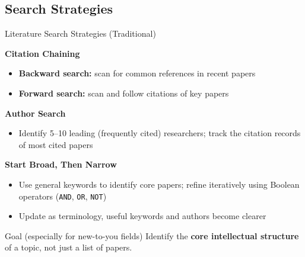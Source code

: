 \documentclass{beamer}
\begin{document}
\subsection{Search Strategies}
\begin{frame}{Literature Search Strategies (Traditional)}

  \footnotesize
  \textbf{Citation Chaining}
  \begin{itemize}
    \item \textbf{Backward search:} scan for common references in recent papers
    \item \textbf{Forward search:} scan and follow citations of key papers
  \end{itemize}

  \medskip
  \textbf{Author Search}
  \begin{itemize}
    \item Identify 5--10 leading (frequently cited) researchers;
    track the citation records of most cited papers
  \end{itemize}

  \medskip
  \textbf{Start Broad, Then Narrow}
  \begin{itemize}
    \item Use general keywords to identify core papers;
      refine iteratively using Boolean operators
      (\texttt{AND}, \texttt{OR}, \texttt{NOT})
    \item Update as terminology, useful keywords and authors become clearer
  \end{itemize}

  \medskip
  \begin{block}{Goal (especially for new-to-you fields)}
    Identify the \textbf{core intellectual structure} of a topic,
    not just a list of papers.
  \end{block}

\end{frame}


\end{document}
